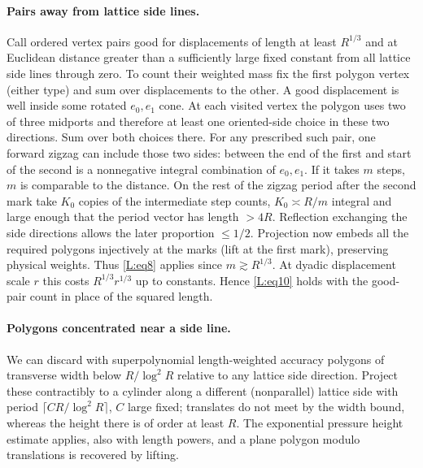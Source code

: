 \paragraph{Pairs away from lattice side lines.}
Call ordered vertex pairs good for displacements of length at least \(R^{1/3}\) and at Euclidean distance greater than a sufficiently large fixed constant from all lattice side lines through zero. To count their weighted mass fix the first polygon vertex (either type) and sum over displacements to the other. A good displacement is well inside some rotated \(e_0,e_1\) cone. At each visited vertex the polygon uses two of three midports and therefore at least one oriented-side choice in these two directions. Sum over both choices there. For any prescribed such pair, one forward zigzag can include those two sides: between the end of the first and start of the second is a nonnegative integral combination of \(e_0,e_1\). If it takes \(m\) steps, \(m\) is comparable to the distance. On the rest of the zigzag period after the second mark take \(K_0\) copies of the intermediate step counts, \(K_0\asymp R/m\) integral and large enough that the period vector has length \(>4R\). Reflection exchanging the side directions allows the later proportion \(\le1/2\). Projection now embeds all the required polygons injectively at the marks (lift at the first mark), preserving physical weights. Thus \eqref{L:eq8} applies since \(m\gtrsim R^{1/3}\). At dyadic displacement scale \(r\) this costs \(R^{1/3} r^{1/3}\) up to constants. Hence \eqref{L:eq10} holds with the good-pair count in place of the squared length.

\paragraph{Polygons concentrated near a side line.}
We can discard with superpolynomial length-weighted accuracy polygons of transverse width below \(R/\log^2 R\) relative to any lattice side direction. Project these contractibly to a cylinder along a different (nonparallel) lattice side with period \(\lceil C R/\log^2 R\rceil\), \(C\) large fixed; translates do not meet by the width bound, whereas the height there is of order at least \(R\). The exponential pressure height estimate applies, also with length powers, and a plane polygon modulo translations is recovered by lifting.

